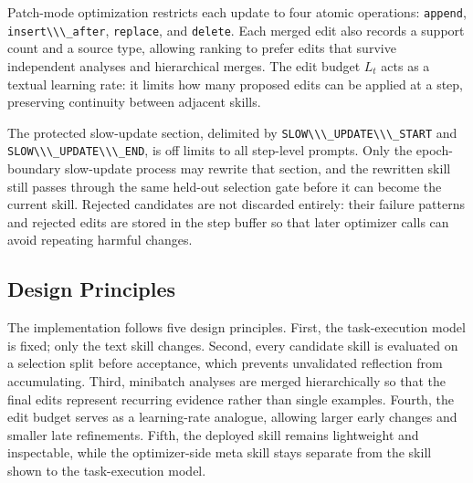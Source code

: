 \documentclass[
]{article}
\newcommand{\passthrough}[1]{#1}
\begin{document}
Patch-mode optimization restricts each update to four atomic operations:
\passthrough{\lstinline!append!},
\passthrough{\lstinline!insert\\\_after!},
\passthrough{\lstinline!replace!}, and \passthrough{\lstinline!delete!}.
Each merged edit also records a support count and a source type,
allowing ranking to prefer edits that survive independent analyses and
hierarchical merges. The edit budget \(L_t\) acts as a textual learning
rate: it limits how many proposed edits can be applied at a step,
preserving continuity between adjacent skills.

The protected slow-update section, delimited by
\passthrough{\lstinline!SLOW\\\_UPDATE\\\_START!} and
\passthrough{\lstinline!SLOW\\\_UPDATE\\\_END!}, is off limits to all
step-level prompts. Only the epoch-boundary slow-update process may
rewrite that section, and the rewritten skill still passes through the
same held-out selection gate before it can become the current skill.
Rejected candidates are not discarded entirely: their failure patterns
and rejected edits are stored in the step buffer so that later optimizer
calls can avoid repeating harmful changes.

\subsection{Design Principles}\label{sec-app-design-principles}

The implementation follows five design principles. First, the
task-execution model is fixed; only the text skill changes. Second,
every candidate skill is evaluated on a selection split before
acceptance, which prevents unvalidated reflection from accumulating.
Third, minibatch analyses are merged hierarchically so that the final
edits represent recurring evidence rather than single examples. Fourth,
the edit budget serves as a learning-rate analogue, allowing larger
early changes and smaller late refinements. Fifth, the deployed skill
remains lightweight and inspectable, while the optimizer-side meta skill
stays separate from the skill shown to the task-execution model.
\end{document}
